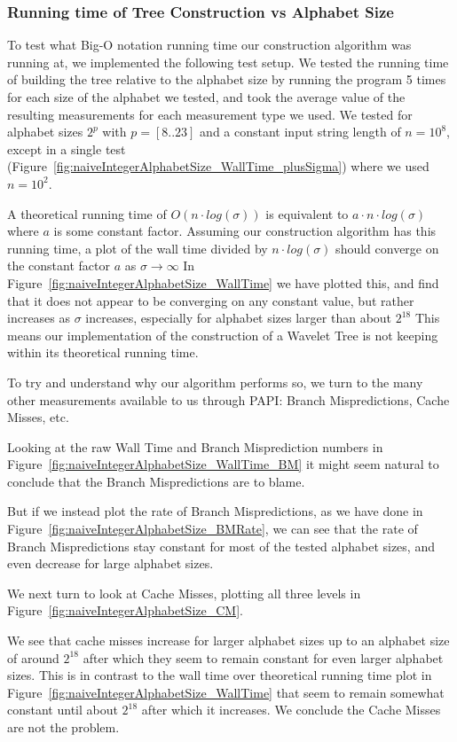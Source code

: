 \subsubsection{Running time of Tree Construction vs Alphabet Size}
To test what Big-O notation running time our construction algorithm was running at, we implemented the following test setup.
We tested the running time of building the tree relative to the alphabet size by running the program 5 times for each size of the alphabet we tested, and took the average value of the resulting measurements for each measurement type we used.
We tested for alphabet sizes $2^p$ with $p = [8..23]$ and a constant input string length of $n = 10^8$, except in a single test (Figure~\ref{fig:naiveIntegerAlphabetSize_WallTime_plusSigma}) where we used $n = 10^2$.

A theoretical running time of $O(n \cdot log(\sigma))$ is equivalent to $a \cdot n \cdot log(\sigma)$ where $a$ is some constant factor.
Assuming our construction algorithm has this running time, a plot of the wall time divided by $n \cdot log(\sigma)$ should converge on the constant factor $a$ as $\sigma \rightarrow \infty$
In Figure~\ref{fig:naiveIntegerAlphabetSize_WallTime} we have plotted this, and find that it does not appear to be converging on any constant value, but rather increases as $\sigma$ increases, especially for alphabet sizes larger than about $2^{18}$
This means our implementation of the construction of a Wavelet Tree is not keeping within its theoretical running time.



To try and understand why our algorithm performs so, we turn to the many other measurements available to us through PAPI: Branch Mispredictions, Cache Misses, etc.

Looking at the raw Wall Time and Branch Misprediction numbers in Figure~\ref{fig:naiveIntegerAlphabetSize_WallTime_BM} it might seem natural to conclude that the Branch Mispredictions are to blame.

But if we instead plot the rate of Branch Mispredictions, as we have done in Figure~\ref{fig:naiveIntegerAlphabetSize_BMRate}, we can see that the rate of Branch Mispredictions stay constant for most of the tested alphabet sizes, and even decrease for large alphabet sizes.

We next turn to look at Cache Misses, plotting all three levels in Figure~\ref{fig:naiveIntegerAlphabetSize_CM}.

We see that cache misses increase for larger alphabet sizes up to an alphabet size of around $2^{18}$ after which they seem to remain constant for even larger alphabet sizes.
This is in contrast to the wall time over theoretical running time plot in Figure~\ref{fig:naiveIntegerAlphabetSize_WallTime} that seem to remain somewhat constant until about $2^{18}$ after which it increases.
We conclude the Cache Misses are not the problem.

